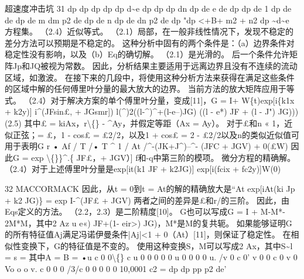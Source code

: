 \documentclass[UTF8,11pt,a4paper,openany,fontset=fandol]{ctexbook}
\begin{document}
超速度冲击坑 31 dp dp dp dp dp d\textasciitilde{}e dp dp dp dn dp de e de dp dp de 1 dp de de dp de m dm p2 de dp de n dp de dn p2 de dp "dp <+B+ m2 + n2 dp \textasciitilde{}d\textasciitilde{}e 方程集。 （2.4）近似等式。 （2.1）局部，在一般非线性情况下，发现不稳定的差分方法可以预期是不稳定的。 这种分析中固有的两个条件是：（a）边界条件对稳定性没有影响，以及（b）Eq的确切解。 （2.1）是光滑的。 后一个条件允许矩阵Jp和JQ被视为常数。 因此，分析结果主要适用于远离边界且没有不连续的流动区域，如激波。 在接下来的几段中，将使用这种分析方法来获得在满足这些条件的区域中解的任何傅里叶分量的最大放大的边界。 当前方法的放大矩阵应用于等式。 （2.4）对于解决方案的单个傅里叶分量，变成[11]，G = I+ W\{t)exp[i\{k1x + k2y)] i\textasciicircum{}(JFsin£, + JGsmr]) l(\textasciicircum{})2((l-\textasciicircum{})\textasciicircum{}+(l-e--)JG) ((l - e*) JF + (l - J") JG))) (2.5) 其中£ = kiAx，r\textbackslash\{\} - \textasciicircum{}Ay，并假定等距（Ax = Ay）。 对于£和n « 1，近似正弦；= £，1 - cos£ = £2/2，以及1 + cos£ = 2 - £2/2以及n的类似近似值可用于表明G r • Af / T /• T \textasciicircum{} 1 / At /\textasciicircum{}-(JK+J\textasciicircum{})--\textasciicircum{}- (JFC + JGV) + 0(£W) 因此G = exp \textbackslash\{\}\}\textasciicircum{}.\{ JF£，+ JGV）] f和-q中第三阶的模项。 微分方程的精确解。 （2.4）对于上述傅里叶分量是exp[it(k1 JF + k2JG)] exp[i(fcix + fc2y)]W(0)

32 MACCORMACK 因此，从t = 0到t = At的解的精确放大是“At exp[iAt(ki Jp + k2 JG)\} = exp I-\textasciicircum{}(JF£ + JGV) 两者之间的差异是£和r/的三阶。 因此，由Eqs定义的方法。 （2.2，2.3）是二阶精度[10]。 G也可以写成G = I + M-M*- 2M*M，其中2 Az u e«) JF+(1- eir>) JG)，M*是M的复共轭。 如果能够证明G的所有特征值Aj满足冯诺伊曼条件|Aj|<1 + 0（At）[11]，则保证了稳定性。 在相似性变换下，G的特征值是不变的。 使用这种变换S，M可以写成2 Ax，其中S\textasciitilde{}l = s = 其中A = B = •u c 0 0\textbackslash\{\} c u 0 0 0 0 0 u 0 0 0 0 u. /v 0 c 0' v 0 0 c 0 v 0 Vo o o v. c 0 0 0 /3/c 0 0 0 0 0 10,0001 c2 = dp dp pp p2 de'
\end{document}
